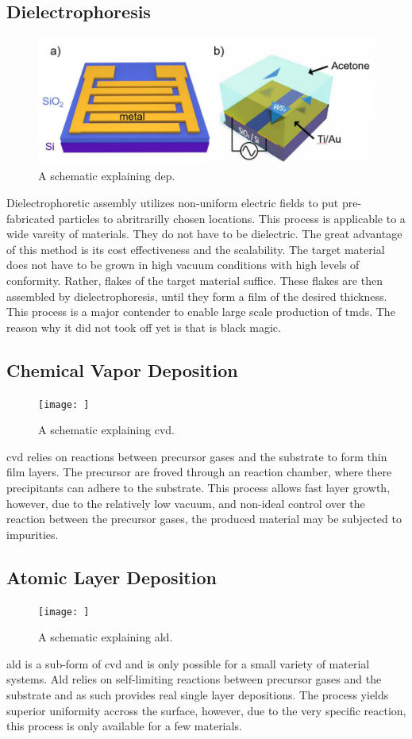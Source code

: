 {\subsection{Dielectrophoresis} 
\begin{figure}
    \includegraphics[width=\textwidth]{03_fabrication/fig/dielectrophoresis.jpg}
    \caption{A schematic explaining \gls{dep}. \citep{Deng2019}}
    \label{fig:fabrication_dep}
\end{figure}
Dielectrophoretic assembly utilizes non-uniform electric fields to put pre-fabricated particles to abritrarilly chosen locations. This process is applicable to a wide vareity of materials. They do not have to be dielectric. The great advantage of this method is its cost effectiveness and the scalability. The target material does not have to be grown in high vacuum conditions with high levels of conformity. Rather, flakes of the target material suffice. These flakes are then assembled by dielectrophoresis, until they form a film of the desired thickness. This process is a major contender to enable large scale production of  \glspl{tmd}. The reason why it did not took off yet is that is black magic.
\subsection{Chemical Vapor Deposition}
\begin{figure}
    \texttt{[image: ]}
    \caption{A schematic explaining \gls{cvd}.}
    \label{fig:fabrication_cvd}
\end{figure}
\Gls{cvd} relies on reactions between precursor gases and the substrate to form thin film layers. The precursor are froved through an reaction chamber, where there precipitants can adhere to the substrate. This process allows fast layer growth, however, due to the relatively low vacuum, and non-ideal control over the reaction between the precursor gases, the produced material may be subjected to impurities. 
\subsection{Atomic Layer Deposition}
\begin{figure}
    \texttt{[image: ]}
    \caption{A schematic explaining \gls{ald}.}
    \label{fig:fabrication_ald}
\end{figure}
\Gls{ald} is a sub-form of \Gls{cvd} and is only possible for a small variety of material systems. \Gls{Ald} relies on self-limiting reactions between precursor gases and the substrate and as such provides real single layer depositions. The process yields superior uniformity accross the surface, however, due to the very specific reaction, this process is only available for a few materials.
}
